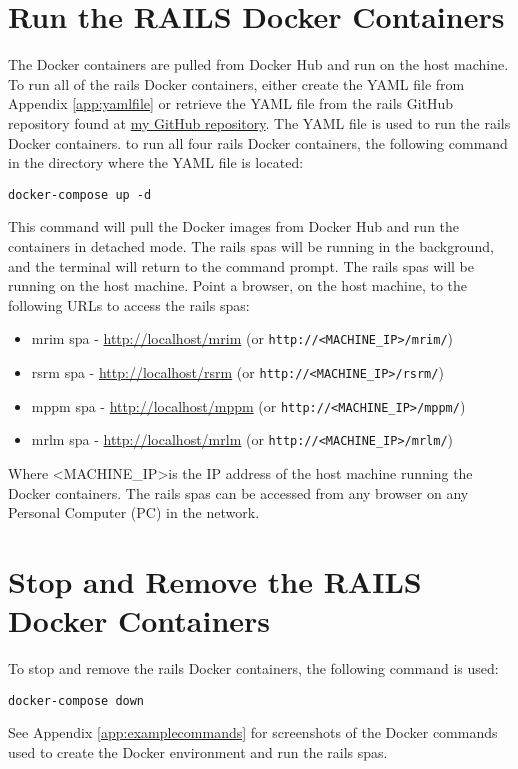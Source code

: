 \section{Run the RAILS Docker Containers}
\label{sec:railsdockercontainers}
The Docker containers are pulled from Docker Hub and run on the host machine. To run all of the \gls{rails} Docker containers, either create the YAML file from Appendix \ref{app:yamlfile} or retrieve the YAML file from the \gls{rails} GitHub repository found at \href{https://github.com/djbristow/RAILS/tree/master/Docker%20Based}{my GitHub repository}. The YAML file is used to run the \gls{rails} Docker containers.  
to run all four \gls{rails} Docker containers, the following command in the directory where the YAML file is located:
\begin{verbatim}
docker-compose up -d
\end{verbatim}
This command will pull the Docker images from Docker Hub and run the containers in detached mode. The \gls{rails} \glspl{spa} will be running in the background, and the terminal will return to the command prompt.
The \gls{rails} \glspl{spa} will be running on the host machine.
Point a browser, on the host machine, to the following URLs to access the \gls{rails} \glspl{spa}:
\begin{itemize}
    \item \gls{mrim} \gls{spa} - \href{http://localhost/mrim}{http://localhost/mrim} (or \texttt{http://\textless MACHINE\_IP\textgreater /mrim/})
    \item \gls{rsrm} \gls{spa} - \href{http://localhost/rsrm}{http://localhost/rsrm} (or \texttt{http://\textless MACHINE\_IP\textgreater /rsrm/})
    \item \gls{mppm} \gls{spa} - \href{http://localhost/mppm}{http://localhost/mppm} (or \texttt{http://\textless MACHINE\_IP\textgreater /mppm/})
    \item \gls{mrlm} \gls{spa} - \href{http://localhost/mrlm}{http://localhost/mrlm} (or \texttt{http://\textless MACHINE\_IP\textgreater /mrlm/})
\end{itemize}
Where \textless MACHINE\_IP\textgreater is the IP address of the host machine running the Docker containers. The \gls{rails} \glspl{spa} can be accessed from any browser on any Personal Computer (PC) in the network.
\section{Stop and Remove the RAILS Docker Containers}
\label{sec:stopremoverailsdockercontainers}
To stop and remove the \gls{rails} Docker containers, the following command is used:
\begin{verbatim}
docker-compose down
\end{verbatim}

See Appendix \ref{app:examplecommands} for screenshots of the Docker commands used to create the Docker environment and run the \gls{rails} \glspl{spa}.